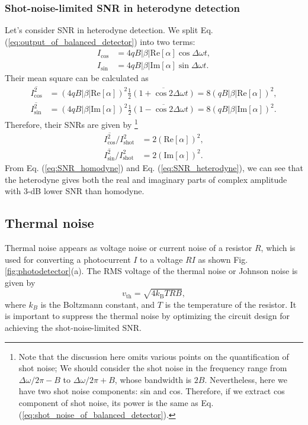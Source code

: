 \subsubsection{Shot-noise-limited SNR in heterodyne detection}
Let's consider SNR in heterodyne detection. We split Eq. (\ref{eq:output_of_balanced_detector}) into two terms:
\begin{equation}
\begin{aligned}
  I_\mathrm{cos} &= 4qB|\beta|\mathrm{Re} [\alpha]\cos\Delta\omega t,\\
  I_\mathrm{sin} &= 4qB|\beta|\mathrm{Im} [\alpha]\sin\Delta\omega t.
\end{aligned}
\end{equation}
Their mean square can be calculated as
\begin{equation}
\begin{aligned}
  \overline{I_\mathrm{cos}^2} &= (4qB|\beta|\mathrm{Re} [\alpha])^2 \frac{1}{2}\overline{(1+\cos 2\Delta \omega t)} = 8(qB|\beta|\mathrm{Re} [\alpha])^2,\\
  \overline{I_\mathrm{sin}^2} &= (4qB|\beta|\mathrm{Im} [\alpha])^2 \frac{1}{2}\overline{(1-\cos 2\Delta \omega t)} = 8(qB|\beta|\mathrm{Im} [\alpha])^2.
\end{aligned}
\end{equation}
Therefore, their SNRs are given by
\footnote{Note that the discussion here omits various points on the quantification of shot noise; We should consider the shot noise in the frequency range from $\Delta \omega / 2\pi - B$ to $\Delta \omega / 2\pi + B$, whose bandwidth is $2B$. Nevertheless, here we have two shot noise components: sin and cos. Therefore, if we extract cos component of shot noise, its power is the same as Eq. (\ref{eq:shot_noise_of_balanced_detector}).}
\begin{equation}
\begin{aligned}
  \overline{I_\mathrm{cos}^2}/I_\mathrm{shot}^2 &= 2(\mathrm{Re} [\alpha])^2,\\
  \overline{I_\mathrm{sin}^2}/I_\mathrm{shot}^2 &= 2(\mathrm{Im} [\alpha])^2.
\end{aligned}
\label{eq:SNR_heterodyne}
\end{equation}
From Eq. (\ref{eq:SNR_homodyne}) and Eq. (\ref{eq:SNR_heterodyne}), we can see that the heterodyne gives both the real and imaginary parts of complex amplitude with 3-dB lower SNR than homodyne.

\subsection{Thermal noise}
Thermal noise appears as voltage noise or current noise of a resistor $R$, which is used for converting a photocurrent $I$ to a voltage $RI$ as shown Fig. \ref{fig:photodetector}(a). The RMS voltage of the thermal noise or Johnson noise is given by
\begin{equation}
	v_\mathrm{th} = \sqrt{4k_\mathrm{B}TRB},
	\label{eq:Johnson_noise}
\end{equation}
where $k_B$ is the Boltzmann constant, and $T$ is the temperature of the resistor. It is important to suppress the thermal noise by optimizing the circuit design for achieving the shot-noise-limited SNR. 

